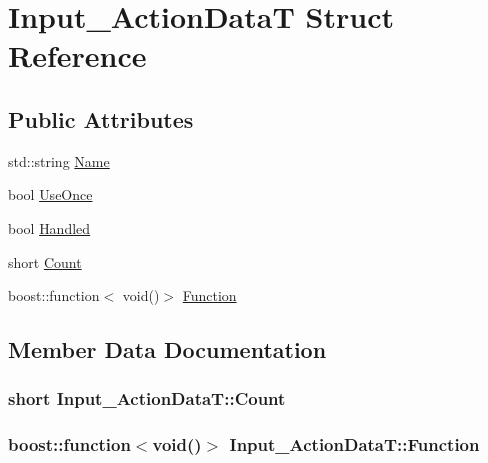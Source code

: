 \hypertarget{struct_input___action_data_t}{
\section{Input\_\-ActionDataT Struct Reference}
\label{struct_input___action_data_t}
}
\subsection*{Public Attributes}
\begin{CompactItemize}
\item 
std::string \hyperlink{struct_input___action_data_t_cfbae530d1e65cefa0e545c7f141b987}{Name}
\item 
bool \hyperlink{struct_input___action_data_t_071f820e9d56093a4f8e3a2e998fe537}{UseOnce}
\item 
bool \hyperlink{struct_input___action_data_t_cdf255496d583843902719cefc8abd01}{Handled}
\item 
short \hyperlink{struct_input___action_data_t_f041f5bfc9fd2adf7a4db1a71da670eb}{Count}
\item 
boost::function$<$ void()$>$ \hyperlink{struct_input___action_data_t_371c42c3c21b00adc1bb3c70e2143eba}{Function}
\end{CompactItemize}


\subsection{Member Data Documentation}
\hypertarget{struct_input___action_data_t_f041f5bfc9fd2adf7a4db1a71da670eb}{
\subsubsection[{Count}]{\setlength{\rightskip}{0pt plus 5cm}short {\bf Input\_\-ActionDataT::Count}}}
\label{struct_input___action_data_t_f041f5bfc9fd2adf7a4db1a71da670eb}


\hypertarget{struct_input___action_data_t_371c42c3c21b00adc1bb3c70e2143eba}{
\subsubsection[{Function}]{\setlength{\rightskip}{0pt plus 5cm}boost::function$<$void()$>$ {\bf Input\_\-ActionDataT::Function}}}
\label{struct_input___action_data_t_371c42c3c21b00adc1bb3c70e2143eba}


